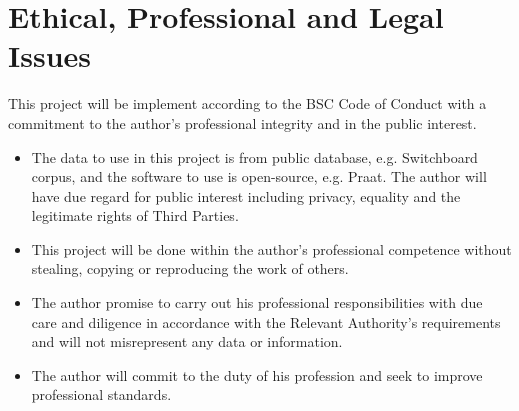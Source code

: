 \section{Ethical, Professional and Legal Issues}
This project will be implement according to the BSC Code of Conduct with a commitment to the author's professional integrity and in the public interest.

\begin{itemize}
    
    \item The data to use in this project is from public database, e.g. Switchboard corpus, and the software to use is open-source, e.g. Praat. The author will have due regard for public interest including privacy, equality and  the legitimate rights of Third Parties.
    
    \item This project will be done within the author's professional competence without stealing, copying or reproducing the work of others.
    
    \item The author promise to carry out his professional responsibilities with due care and
    diligence in accordance with the Relevant Authority’s requirements and will not misrepresent any data or information.
    
    \item The author will commit to the duty of his profession and seek to improve professional standards.
\end{itemize}




